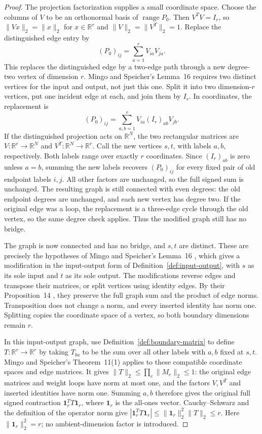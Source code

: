 \documentclass[11pt]{article}
\theoremstyle{definition}
\theoremstyle{remark}
\theoremstyle{plain}
\newcommand{\R}{\mathbb R}
\newcommand{\one}{\mathbf 1}
\begin{document}
\begin{proof}
The projection factorization supplies a small coordinate space.
Choose the columns of $V$ to be an orthonormal basis of
$\operatorname{range}P_0$. Then $V^TV=I_r$, so
$\|Vx\|_2=\|x\|_2$ for $x\in\R^r$ and
$\|V\|_2=\|V^T\|_2=1$.
Replace the distinguished edge entry by
\[
 (P_0)_{ij}=\sum_{a=1}^r V_{ia}V_{ja}.
\]
This replaces the distinguished edge by a two-edge path through
a new degree-two vertex of dimension \(r\). Mingo and Speicher's
Lemma~16 requires two distinct vertices for the input and output,
not just this one.
Split it into two dimension-\(r\) vertices, put one incident edge
at each, and join them by \(I_r\). In coordinates, the replacement is
\[
 (P_0)_{ij}
   =\sum_{a,b=1}^r V_{ia}(I_r)_{ab}V_{jb}.
\]
If the distinguished projection acts on $\R^N$, the two rectangular
matrices are $V:\R^r\to\R^N$ and $V^T:\R^N\to\R^r$.
Call the new vertices $s,t$, with labels $a,b$, respectively.
Both labels range over exactly $r$ coordinates. Since
$(I_r)_{ab}$ is zero unless $a=b$, summing the new labels recovers
$(P_0)_{ij}$ for every fixed pair of old endpoint labels $i,j$.
All other factors are unchanged, so the full signed sum is unchanged.
The resulting graph is still connected with even degrees: the old
endpoint degrees are unchanged, and each new vertex has degree two.
If the original edge was a loop, the replacement is a three-edge
cycle through the old vertex, so the same degree check applies.
Thus the modified graph still has no bridge.

The graph is now connected and has no bridge, and $s,t$ are
distinct. These are precisely the hypotheses of Mingo and
Speicher's Lemma~16 \cite{mingo}, which gives a modification in
the input-output form of Definition~\ref{def:input-output},
with $s$ as its sole input and $t$ as its sole
output. The modifications reverse edges and transpose their
matrices, or split vertices using identity edges. By their
Proposition~14 \cite{mingo}, they preserve the full graph sum
and the product of edge norms. Transposition does not change a
norm, and every inserted identity has norm one. Splitting copies
the coordinate space of a vertex, so both boundary dimensions remain $r$.

In this input-output graph, use Definition~\ref{def:boundary-matrix}
to define \(T:\R^r\to\R^r\) by taking $T_{ba}$
to be the sum over all other labels with $a,b$ fixed at $s,t$. Mingo and
Speicher's Theorem~11(1) \cite{mingo} applies to these compatible
coordinate spaces and edge matrices. It gives
$\|T\|_2\le\prod_e\|M_e\|_2\le1$: the original edge matrices
and weight loops have norm at most one, and the factors $V,V^T$
and inserted identities have norm one.
Summing $a,b$ therefore gives the original full signed contraction
\(\one_r^T T\one_r\), where $\one_r$ is the all-ones vector.
Cauchy--Schwarz and the definition of the operator norm give
$|\one_r^TT\one_r|\le\|\one_r\|_2^2\|T\|_2\le r$.
Here $\|\one_r\|_2^2=r$; no ambient-dimension factor is introduced.
\end{proof}
\end{document}
